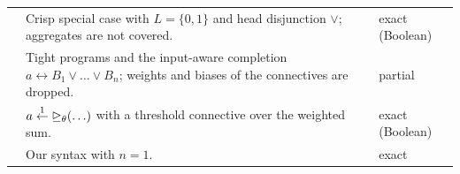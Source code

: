 {\begin{longtable}{@{}p{}p{}p{}@{}}
            \cite{HeyninckAB22arxiv,PelovT04}                                                               & Crisp special case with $L=\{0,1\}$ and head disjunction $\vee$; aggregates are not covered.                                                                                                                                                                        & exact (Boolean)                        \\
            \cite{RiegelEtAl20,SenCRG22}                                                                    & Tight programs and the input-aware completion $a\leftrightarrow B_1\lor\dots\lor B_n$; weights and biases of the connectives are dropped.                                                                                                                           & partial                                \\
            \cite{Antic24}                                                                                  & $a\overset{1}{\gets}\mathord{\trianglerighteq_{\theta}}(\ldots)$ with a threshold connective over the weighted sum.                                                                                                                                                                               & exact (Boolean)                        \\
            \cite{KettmannHS25,KettmannSHS26arxiv}                                                          & Our syntax with $n=1$.                                                                                                                                                                                                                                              & exact                                  \\
        \end{longtable}

}
